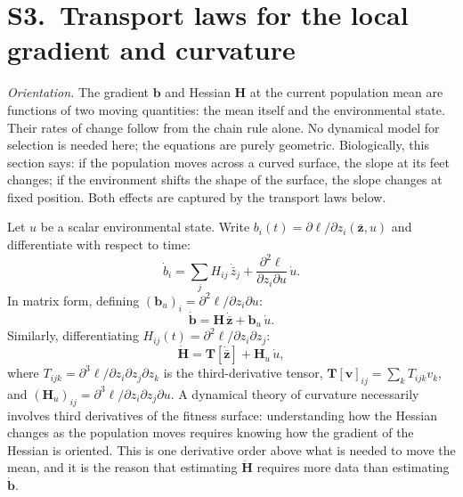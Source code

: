 \documentclass[11pt]{article}
\newcommand{\vect}[1]{\boldsymbol{#1}}
\newcommand{\mat}[1]{\mathbf{#1}}
\begin{document}
\section*{S3.~Transport laws for the local gradient and curvature}
\label{sec:transport}

\noindent\textit{Orientation.}
The gradient $\vect{b}$ and Hessian $\mat{H}$ at the current
population mean are functions of two moving quantities: the
mean itself and the environmental state.
Their rates of change follow from the chain rule alone.
No dynamical model for selection is needed here; the equations
are purely geometric.
Biologically, this section says: if the population moves across
a curved surface, the slope at its feet changes; if the
environment shifts the shape of the surface, the slope changes
at fixed position.
Both effects are captured by the transport laws below.

Let $u$ be a scalar environmental state.
Write $b_i(t) = \partial\ell/\partial z_i(\bar{\vect{z}},u)$ and
differentiate with respect to time:
\begin{equation}
\dot{b}_i
= \sum_j H_{ij}\,\dot{\bar{z}}_j
+ \frac{\partial^2\ell}{\partial z_i\partial u}\,\dot{u}.
\label{eq:S3_bdot_comp}
\end{equation}
In matrix form, defining
$({\vect{b}}_u)_i = \partial^2\ell/\partial z_i\partial u$:
\begin{equation}
\dot{\vect{b}}
= \mat{H}\,\dot{\bar{\vect{z}}} + \vect{b}_u\,\dot{u}.
\label{eq:S3_bdot}
\end{equation}
Similarly, differentiating
$H_{ij}(t) = \partial^2\ell/\partial z_i\partial z_j$:
\begin{equation}
\dot{\mat{H}}
= \mat{T}[\dot{\bar{\vect{z}}}] + \mat{H}_u\,\dot{u},
\label{eq:S3_Hdot}
\end{equation}
where $T_{ijk} = \partial^3\ell/\partial z_i\partial z_j\partial z_k$
is the third-derivative tensor,
$\mat{T}[\vect{v}]_{ij} = \sum_k T_{ijk}v_k$, and
$(\mat{H}_u)_{ij} = \partial^3\ell/\partial z_i\partial z_j\partial u$.
A dynamical theory of curvature necessarily involves third derivatives
of the fitness surface: understanding how the Hessian changes as the
population moves requires knowing how the gradient of the Hessian
is oriented.
This is one derivative order above what is needed to move the mean,
and it is the reason that estimating $\dot{\mat{H}}$ requires
more data than estimating $\dot{\vect{b}}$.
\end{document}
